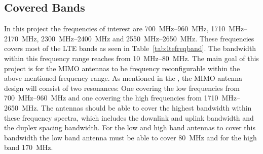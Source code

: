 \subsection{Covered Bands}
In this project the frequencies of interest are \SIrange{700}{960}{MHz}, \SIrange{1710}{2170}{MHz}, \SIrange{2300}{2400}{MHz} and \SIrange{2550}{2650}{MHz}. These frequencies covers most of the LTE bands as seen in Table~\ref{tab:ltefreqband}. The bandwidth within this frequency range reaches from \SIrange{10}{80}{MHz}. The main goal of this project is for the MIMO antennas to be frequency reconfigurable within the above mentioned frequency range. As mentioned in the , the MIMO antenna design will consist of two resonances: One covering the low frequencies from \SIrange{700}{960}{MHz} and one covering the high frequencies from \SIrange{1710}{2650}{MHz}. The antennas should be able to cover the highest bandwidth within these frequency spectra, which includes the downlink and uplink bandwidth and the duplex spacing bandwidth. For the low and high band antennas to cover this bandwidth the low band antenna must be able to cover \SI{80}{MHz} and for the high band \SI{170}{MHz}.  

